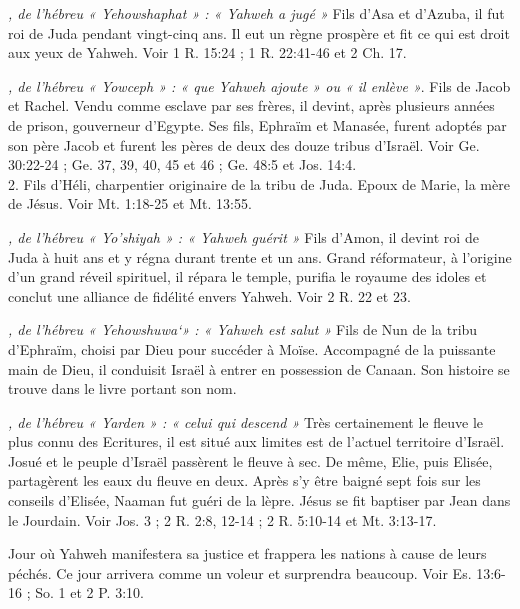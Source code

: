 \begin{multicols}{2}
{\textit{, de l'hébreu « Yehowshaphat » : « Yahweh a jugé »}\newline
Fils d'Asa et d'Azuba, il fut roi de Juda pendant vingt-cinq ans. Il eut un règne prospère et fit ce qui est droit aux yeux de Yahweh. Voir 1 R. 15:24 ; 1 R. 22:41-46 et 2 Ch. 17.

\textit{, de l'hébreu « Yowceph » : « que Yahweh ajoute » ou « il enlève »}. Fils de Jacob et Rachel. Vendu comme esclave par ses frères, il devint, après plusieurs années de prison, gouverneur d'Egypte. Ses fils, Ephraïm et Manasée, furent adoptés par son père Jacob et furent les pères de deux des douze tribus d'Israël. Voir Ge. 30:22-24 ; Ge. 37, 39, 40, 45 et 46 ; Ge. 48:5 et Jos. 14:4.
\\2. Fils d'Héli, charpentier originaire de la tribu de Juda. Epoux de Marie, la mère de Jésus. Voir Mt. 1:18-25 et Mt. 13:55.

\textit{, de l'hébreu « Yo'shiyah » : « Yahweh guérit »}\newline
Fils d'Amon, il devint roi de Juda à huit ans et y régna durant trente et un ans. Grand réformateur, à l'origine d'un grand réveil spirituel, il répara le temple, purifia le royaume des idoles et conclut une alliance de fidélité envers Yahweh. Voir 2 R. 22 et 23.

\textit{, de l'hébreu « Yehowshuwa`» : « Yahweh est salut »}\newline
Fils de Nun de la tribu d'Ephraïm, choisi par Dieu pour succéder à Moïse. Accompagné de la puissante main de Dieu, il conduisit Israël à entrer en possession de Canaan. Son histoire se trouve dans le livre portant son nom.

\textit{, de l'hébreu « Yarden » : « celui qui descend »}\newline
Très certainement le fleuve le plus connu des Ecritures, il est situé aux limites est de l'actuel territoire d'Israël. Josué et le peuple d'Israël passèrent le fleuve à sec. De même, Elie, puis Elisée, partagèrent les eaux du fleuve en deux. Après s'y être baigné sept fois sur les conseils d'Elisée, Naaman fut guéri de la lèpre. Jésus se fit baptiser par Jean dans le Jourdain. Voir Jos. 3 ; 2 R. 2:8, 12-14 ; 2 R. 5:10-14 et Mt. 3:13-17.

\textit{}\newline
Jour où Yahweh manifestera sa justice et frappera les nations à cause de leurs péchés. Ce jour arrivera comme un voleur et surprendra beaucoup. Voir Es. 13:6-16 ; So. 1 et 2 P. 3:10.

}
\end{multicols}
